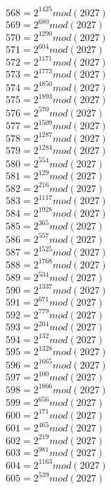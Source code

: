 \documentclass[12pt, letterpaper]{article}
\begin{document}
\begin{itemize}
\begin{multicols}{3}
$568= 2^{1425} mod (2027)$\\
$569= 2^{680} mod (2027)$\\
$570= 2^{1290} mod (2027)$\\
$571= 2^{604} mod (2027)$\\
$572= 2^{1171} mod (2027)$\\
$573= 2^{1773} mod (2027)$\\
$574= 2^{1850} mod (2027)$\\
$575= 2^{1893} mod (2027)$\\
$576= 2^{570} mod (2027)$\\
$577= 2^{1509} mod (2027)$\\
$578= 2^{1287} mod (2027)$\\
$579= 2^{1284} mod (2027)$\\
$580= 2^{554} mod (2027)$\\
$581= 2^{129} mod (2027)$\\
$582= 2^{216} mod (2027)$\\
$583= 2^{1117} mod (2027)$\\
$584= 2^{1928} mod (2027)$\\
$585= 2^{365} mod (2027)$\\
$586= 2^{557} mod (2027)$\\
$587= 2^{1525} mod (2027)$\\
$588= 2^{1768} mod (2027)$\\
$589= 2^{534} mod (2027)$\\
$590= 2^{1337} mod (2027)$\\
$591= 2^{671} mod (2027)$\\
$592= 2^{779} mod (2027)$\\
$593= 2^{204} mod (2027)$\\
$594= 2^{132} mod (2027)$\\
$595= 2^{1328} mod (2027)$\\
$596= 2^{1665} mod (2027)$\\
$597= 2^{100} mod (2027)$\\
$598= 2^{1866} mod (2027)$\\
$599= 2^{656} mod (2027)$\\
$600= 2^{171} mod (2027)$\\
$601= 2^{465} mod (2027)$\\
$602= 2^{219} mod (2027)$\\
$603= 2^{981} mod (2027)$\\
$604= 2^{1163} mod (2027)$\\
$605= 2^{539} mod (2027)$\\

\end{multicols}
\end{itemize}
\end{document}
